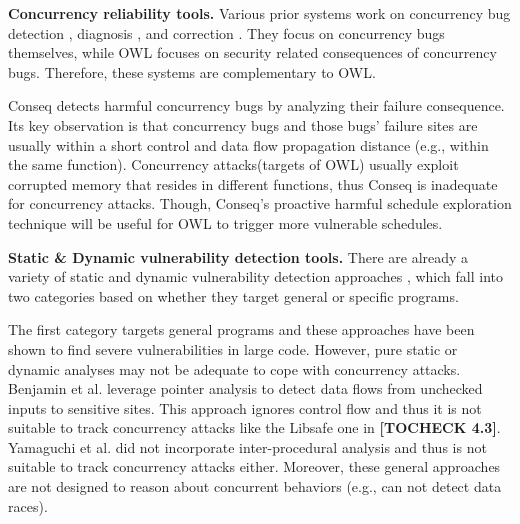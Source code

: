 \noindent
\textbf{Concurrency reliability tools.} Various prior systems work
on concurrency bug detection \cite{yu:racetrack:sosp,savage:eraser,racerx:sosp03,lu:muvi:sosp,avio:asplos06,conmem:asplos10,conseq:asplos11,kasikci2013racemob,wester:parallelizing:asplos13,kasikci2015techniques}, diagnosis \cite{racefuzzer:pldi08,ctrigger:asplos09,kasikci2015techniques,atomfuzzer:fse08,attariyan2012x,failure:sketch:sosp15}, and correction \cite{deadlock-immunity:osdi08,gadara:osdi08,wu:loom:osdi10,automated:osdi}. They focus on concurrency bugs themselves, while
OWL focuses on security related consequences of concurrency
bugs. Therefore, these systems are complementary to OWL.

Conseq \cite{conseq:asplos11} detects harmful concurrency bugs by analyzing
their failure consequence. Its key observation is that concurrency
bugs and those bugs' failure sites are usually within a
short control and data flow propagation distance (e.g., within
the same function). Concurrency attacks(targets of OWL)
usually exploit corrupted memory that resides in different
functions, thus Conseq is inadequate for concurrency attacks.
Though, Conseq’s proactive harmful schedule exploration technique
will be useful for OWL to trigger more vulnerable schedules.

\noindent
\textbf{Static \& Dynamic vulnerability detection tools.} There are already a variety
of static and dynamic vulnerability detection approaches \cite{livshits05finding,yamaguchi2014modeling,felmetsger2010toward,felmetsger2010toward,srivastava2011security,zhang:usenix:sec02, paleari2008race}, which fall into two categories based
on whether they target general or specific programs.

The first category \cite{livshits05finding,yamaguchi2014modeling} targets general programs and
these approaches have been shown to find severe vulnerabilities
in large code. However, pure static or dynamic analyses may
not be adequate to cope with concurrency attacks. Benjamin
et al. \cite{livshits05finding} leverage pointer analysis to detect data flows from
unchecked inputs to sensitive sites. This approach ignores
control flow and thus it is not suitable to track concurrency
attacks like the Libsafe one in \textbf{[TOCHECK 4.3]}. Yamaguchi et al. \cite{yamaguchi2014modeling}
did not incorporate inter-procedural analysis and thus is not
suitable to track concurrency attacks either. Moreover, these
general approaches are not designed to reason about concurrent
behaviors (e.g., \cite{yamaguchi2014modeling} can not detect data races).


